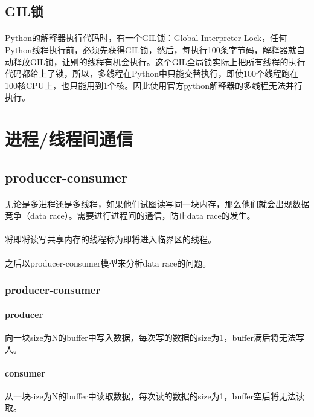 \documentclass[12pt]{article}
\begin{document}
\begin{CJK}{UTF8}{gbsn}
\subsection{GIL锁}
\paragraph{}Python的解释器执行代码时，有一个GIL锁：Global Interpreter Lock，任何Python线程执行前，必须先获得GIL锁，然后，每执行100条字节码，解释器就自动释放GIL锁，让别的线程有机会执行。这个GIL全局锁实际上把所有线程的执行代码都给上了锁，所以，多线程在Python中只能交替执行，即使100个线程跑在100核CPU上，也只能用到1个核。因此使用官方python解释器的多线程无法并行执行。


\section{进程/线程间通信}
\subsection{producer-consumer}
\paragraph{}无论是多进程还是多线程，如果他们试图读写同一块内存，那么他们就会出现数据竞争（data race）。需要进行进程间的通信，防止data race的发生。
\paragraph{}将即将读写共享内存的线程称为即将进入临界区的线程。
\paragraph{}之后以producer-consumer模型来分析data race的问题。
\subsubsection{producer-consumer}
\paragraph{producer}向一块size为N的buffer中写入数据，每次写的数据的size为1，buffer满后将无法写入。
\paragraph{consumer}从一块size为N的buffer中读取数据，每次读的数据的size为1，buffer空后将无法读取。



\end{CJK}
\end{document}
